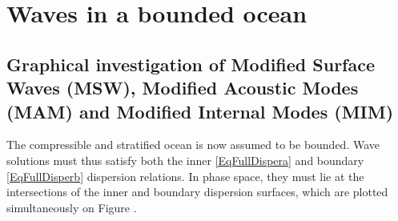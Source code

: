 \section{Waves in a bounded ocean}
\label{SectionGraphic}

\subsection{Graphical investigation of Modified Surface Waves (MSW), Modified Acoustic Modes (MAM) and Modified Internal Modes (MIM)}
\label{SubSectionPotBranches}

The compressible and stratified ocean is now assumed to be bounded. Wave solutions must thus satisfy both the inner \ref{EqFullDispera} and boundary \ref{EqFullDisperb} dispersion relations. In phase space, they must lie at the intersections of the inner and boundary dispersion surfaces, which are plotted simultaneously on Figure .
%
